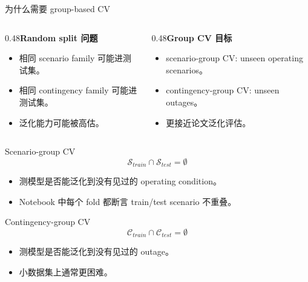 \documentclass[aspectratio=169,11pt]{beamer}
\begin{document}
\begin{frame}{为什么需要 group-based CV}
\begin{columns}\begin{column}{0.48\textwidth}\textbf{Random split 问题}\begin{itemize}\item 相同 scenario family 可能进测试集。\item 相同 contingency family 可能进测试集。\item 泛化能力可能被高估。\end{itemize}\end{column}\begin{column}{0.48\textwidth}\textbf{Group CV 目标}\begin{itemize}\item scenario-group CV: unseen operating scenarios。\item contingency-group CV: unseen outages。\item 更接近论文泛化评估。\end{itemize}\end{column}\end{columns}
\end{frame}

\begin{frame}{Scenario-group CV}\[\mathcal{S}_{train}\cap\mathcal{S}_{test}=\emptyset\]\begin{itemize}\item 测模型是否能泛化到没有见过的 operating condition。\item Notebook 中每个 fold 都断言 train/test scenario 不重叠。\end{itemize}\end{frame}
\begin{frame}{Contingency-group CV}\[\mathcal{C}_{train}\cap\mathcal{C}_{test}=\emptyset\]\begin{itemize}\item 测模型是否能泛化到没有见过的 outage。\item 小数据集上通常更困难。\end{itemize}\end{frame}
\end{document}

